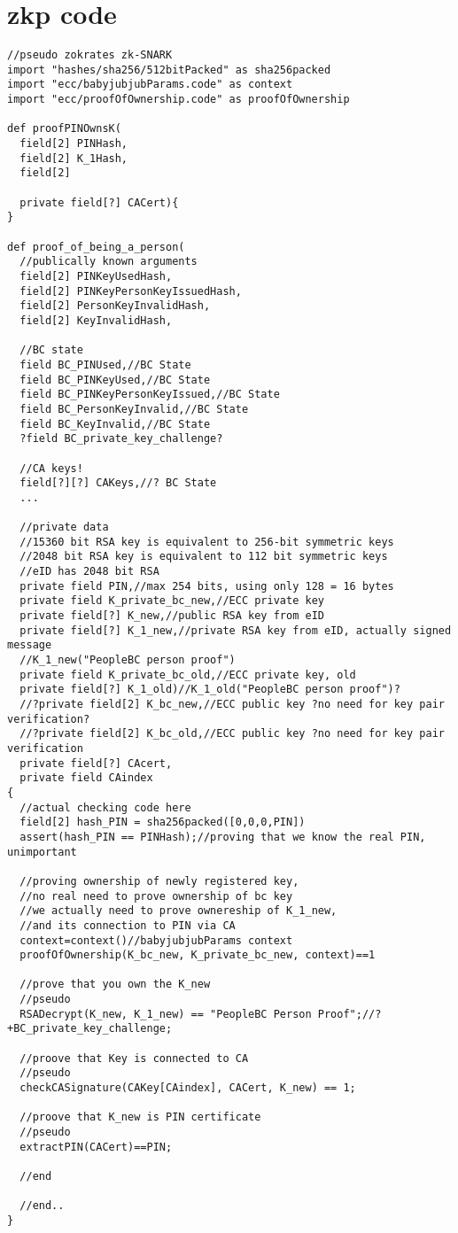 \documentclass{article}
\begin{document}
\newpage
\section{zkp code}
\begin{lstlisting}
//pseudo zokrates zk-SNARK
import "hashes/sha256/512bitPacked" as sha256packed
import "ecc/babyjubjubParams.code" as context
import "ecc/proofOfOwnership.code" as proofOfOwnership

def proofPINOwnsK(
  field[2] PINHash,
  field[2] K_1Hash,
  field[2]

  private field[?] CACert){
}

def proof_of_being_a_person(
  //publically known arguments
  field[2] PINKeyUsedHash,
  field[2] PINKeyPersonKeyIssuedHash,
  field[2] PersonKeyInvalidHash,
  field[2] KeyInvalidHash,

  //BC state
  field BC_PINUsed,//BC State
  field BC_PINKeyUsed,//BC State
  field BC_PINKeyPersonKeyIssued,//BC State
  field BC_PersonKeyInvalid,//BC State
  field BC_KeyInvalid,//BC State
  ?field BC_private_key_challenge?

  //CA keys!
  field[?][?] CAKeys,//? BC State
  ...

  //private data
  //15360 bit RSA key is equivalent to 256-bit symmetric keys
  //2048 bit RSA key is equivalent to 112 bit symmetric keys
  //eID has 2048 bit RSA
  private field PIN,//max 254 bits, using only 128 = 16 bytes
  private field K_private_bc_new,//ECC private key
  private field[?] K_new,//public RSA key from eID
  private field[?] K_1_new,//private RSA key from eID, actually signed message
  //K_1_new("PeopleBC person proof")
  private field K_private_bc_old,//ECC private key, old
  private field[?] K_1_old)//K_1_old("PeopleBC person proof")?
  //?private field[2] K_bc_new,//ECC public key ?no need for key pair verification?
  //?private field[2] K_bc_old,//ECC public key ?no need for key pair verification
  private field[?] CAcert,
  private field CAindex
{
  //actual checking code here
  field[2] hash_PIN = sha256packed([0,0,0,PIN])
  assert(hash_PIN == PINHash);//proving that we know the real PIN, unimportant

  //proving ownership of newly registered key,
  //no real need to prove ownership of bc key
  //we actually need to prove ownereship of K_1_new,
  //and its connection to PIN via CA
  context=context()//babyjubjubParams context
  proofOfOwnership(K_bc_new, K_private_bc_new, context)==1

  //prove that you own the K_new
  //pseudo
  RSADecrypt(K_new, K_1_new) == "PeopleBC Person Proof";//?+BC_private_key_challenge;

  //proove that Key is connected to CA
  //pseudo
  checkCASignature(CAKey[CAindex], CACert, K_new) == 1;

  //proove that K_new is PIN certificate
  //pseudo
  extractPIN(CACert)==PIN;

  //end

  //end..
}
\end{lstlisting}
\newpage
\end{document}
